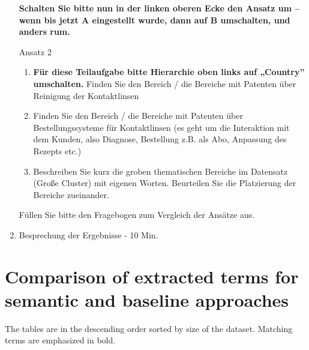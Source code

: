 \begin{enumerate}
\textbf{Schalten Sie bitte nun in der linken oberen Ecke den Ansatz um – wenn bis jetzt A eingestellt wurde, dann auf B umschalten, und anders rum.}

Ansatz 2
\begin{enumerate} 
\item \textbf{Für diese Teilaufgabe bitte Hierarchie oben links auf „Country” umschalten.} Finden Sie den Bereich / die Bereiche mit Patenten über Reinigung der Kontaktlinsen 
\item Finden Sie den Bereich / die Bereiche mit Patenten über Bestellungssysteme für Kontaktlinsen (es geht um die Interaktion mit dem Kunden, also Diagnose, Bestellung z.B. als Abo, Anpassung des Rezepts etc.)
\item Beschreiben Sie kurz die groben thematischen Bereiche im Datensatz (Große Cluster) mit eigenen Worten. Beurteilen Sie die Platzierung der Bereiche zueinander.
\end{enumerate}

Füllen Sie bitte den Fragebogen zum Vergleich der Ansätze aus.
	
\item Besprechung der Ergebnisse - 10 Min.
\end{enumerate}

\section{Comparison of extracted terms for semantic and baseline approaches}
\label{sec:term_comparison}

The tables are in the descending order sorted by size of the dataset. Matching terms are emphasized in bold.

